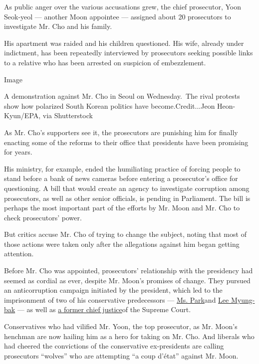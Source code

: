 As public anger over the various accusations grew, the chief prosecutor,
Yoon Seok-yeol --- another Moon appointee --- assigned about 20
prosecutors to investigate Mr. Cho and his family.

His apartment was raided and his children questioned. His wife, already
under indictment, has been repeatedly interviewed by prosecutors seeking
possible links to a relative who has been arrested on suspicion of
embezzlement.

Image

A demonstration against Mr. Cho in Seoul on Wednesday.~The rival
protests show how polarized South Korean politics have
become.Credit...Jeon Heon-Kyun/EPA, via Shutterstock

As Mr. Cho's supporters see it, the prosecutors are punishing him for
finally enacting some of the reforms to their office that presidents
have been promising for years.

His ministry, for example, ended the humiliating practice of forcing
people to stand before a bank of news cameras before entering a
prosecutor's office for questioning. A bill that would create an agency
to investigate corruption among prosecutors, as well as other senior
officials, is pending in Parliament. The bill is perhaps the most
important part of the efforts by Mr. Moon and Mr. Cho to check
prosecutors' power.

But critics accuse Mr. Cho of trying to change the subject, noting that
most of those actions were taken only after the allegations against him
began getting attention.

Before Mr. Cho was appointed, prosecutors' relationship with the
presidency had seemed as cordial as ever, despite Mr. Moon's promises of
change. They pursued an anticorruption campaign initiated by the
president, which led to the imprisonment of two of his conservative
predecessors ---
\href{https://www.nytimes.com/2018/08/24/world/asia/park-geun-hye-sentenced-south-korea.html}{Ms.
Park}and
\href{http://nytimes.com/2018/10/05/world/asia/lee-myung-bak-south-korea-convicted.html}{Lee
Myung-bak} --- as well as
\href{https://www.nytimes.com/2019/01/23/world/asia/south-korea-chief-justice-japan.html}{a
former chief justice}of the Supreme Court.

Conservatives who had vilified Mr. Yoon, the top prosecutor, as Mr.
Moon's henchman are now hailing him as a hero for taking on Mr. Cho. And
liberals who had cheered the convictions of the conservative
ex-presidents are calling prosecutors ``wolves'' who are attempting ``a
coup d'état'' against Mr. Moon.

